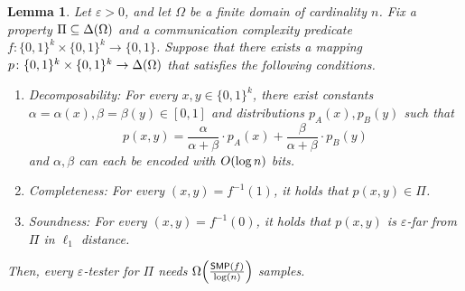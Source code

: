 \documentclass[11pt]{article}
\newtheorem{lemma}[lem]{Lemma}
\theoremstyle{remark}   	\newtheorem{remark}[theorem]{Remark}
\theoremstyle{definition}   	\newaliascnt{defn}{theorem}
\newcommand{\eps}{\ensuremath{\varepsilon}\xspace}
\newcommand{\bigO}[1]{{O\mleft( #1 \mright)}}
\newcommand{\bigOmega}[1]{{\Omega\mleft( #1 \mright)}}
\newcommand{\bitset}{\ensuremath{\{0,1\}}}
\newcommand{\SMP}{\ensuremath{\mathsf{SMP}}}
\begin{document}
\begin{lemma}\label{lemma:main:methodology:reduction}
	Let $\eps>0$, and let $\Omega$ be a finite domain of cardinality $n$. Fix a property $\Pi \subseteq \Delta\!\left(\Omega\right)$ and a communication complexity predicate $f\colon \bitset^k \times \bitset^k \to \bitset$. Suppose that there exists a mapping $p\colon\bitset^k \times \bitset^k \to \distribs{\Omega}$ that satisfies the following conditions.
	\begin{enumerate}
		\item \emph{Decomposability:} For every $x,y\in\bitset^k$, there exist constants $\alpha=\alpha(x), \beta=\beta(y) \in [0,1]$ and distributions $p_A(x), p_B(y)$ such that 
		\[
		p(x,y) = \frac{\alpha}{\alpha+\beta}\cdot p_A(x) + \frac{\beta}{\alpha+\beta}\cdot p_B(y)
		\] 
		and $\alpha,\beta$ can each be encoded with $\bigO{\log n}$ bits.
		\item \emph{Completeness:} For every $(x,y) = f^{-1}(1)$, it holds that $p(x,y) \in \Pi$.
		\item \emph{Soundness:} For every $(x,y) = f^{-1}(0)$, it holds that $p(x,y)$ is $\eps$-far from $\Pi$ in $\ell_1$ distance.
	\end{enumerate}
	Then, every $\eps$-tester for $\Pi$ needs $\bigOmega{\frac{\SMP(f)}{\log(n)}}$ samples.
\end{lemma}
\end{document}
